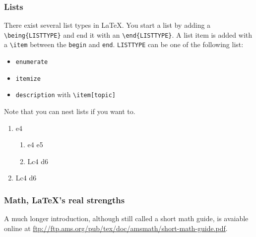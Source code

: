 \documentclass[10pt,a4paper]{scrartcl}
\begin{document}
\subsubsection{Lists}
There exist several list types in \LaTeX. You start a list by adding a 
\verb$\being{LISTTYPE}$ and end it with an \verb$\end{LISTTYPE}$. A list item
is added with a \verb$\item$ between the \texttt{begin} and \texttt{end}.
\texttt{LISTTYPE} can be one of the following list:
\begin{itemize}
	\item \texttt{enumerate}
	\item \texttt{itemize}
	\item \texttt{description} with \verb$\item[topic]$
\end{itemize}
\noindent Note that you can nest lists if you want to.
\begin{enumerate}
	\item{e4} 	
		\begin{enumerate}
			\item{e4}   e5
			\item Lc4 d6
		\end{enumerate}
	\item Lc4 d6
\end{enumerate}

\subsubsection{Math, \LaTeX 's real strengths}
A much longer introduction, although still called a short math guide, is 
avaiable online at \url{ftp://ftp.ams.org/pub/tex/doc/amsmath/short-math-guide.pdf}.
\end{document}
